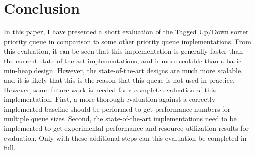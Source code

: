 \section{Conclusion}
\label{sec:conclusion}

In this paper, I have presented a short evaluation of the Tagged Up/Down sorter priority queue in comparison to some other priority queue implementations. From this evaluation, it can be seen that this implementation is generally faster than the current state-of-the-art implementations, and is more scalable than a basic min-heap design. However, the state-of-the-art designs are much more scalable, and it is likely that this is the reason that this queue is not used in practice. However, some future work is needed for a complete evaluation of this implementation. First, a more thorough evaluation against a correctly implemented baseline should be performed to get performance numbers for multiple queue sizes. Second, the state-of-the-art implementations need to be implemented to get experimental performance and resource utilization results for evaluation. Only with these additional steps can this evaluation be completed in full.